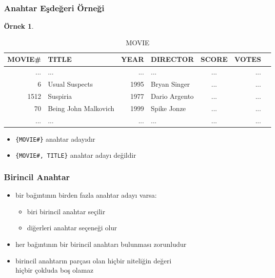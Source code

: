 \documentclass[dvipsnames]{beamer}
\theoremstyle{definition}
\theoremstyle{example}
\newtheorem{ornek}[theorem]{Örnek}
\theoremstyle{plain}
\begin{document}
\begin{frame}
  \frametitle{Anahtar Eşdeğeri Örneği}

  \begin{ornek}
    \begin{tiny}
    \begin{table}
      \caption{MOVIE}
      \begin{tabular}{|r|l|r|l|c|r|r|}\hline
MOVIE\# & TITLE                & YEAR & DIRECTOR      & SCORE & VOTES\\\hline\hline
    ... & ...                  &  ... & ...           & ...   &   ...\\\hline
      6 & Usual Suspects       & 1995 & Bryan Singer  & ...   &   ...\\\hline
   1512 & Suspiria             & 1977 & Dario Argento & ...   &   ...\\\hline
     70 & Being John Malkovich & 1999 & Spike Jonze   & ...   &   ...\\\hline
    ... & ...                  &  ... & ...           & ...   &   ...\\\hline
      \end{tabular}
    \end{table}
    \end{tiny}

    \pause
    \begin{itemize}
      \item \texttt{\{MOVIE\#\}} anahtar adayıdır
      \item \texttt{\{MOVIE\#, TITLE\}} anahtar adayı değildir
    \end{itemize}
  \end{ornek}
\end{frame}

\begin{frame}
  \frametitle{Birincil Anahtar}

  \begin{itemize}
    \item bir bağıntının birden fazla anahtar adayı varsa:
    \begin{itemize}
      \item biri \alert{birincil anahtar} seçilir
      \item diğerleri \alert{anahtar seçeneği} olur
    \end{itemize}

    \pause
    \item her bağıntının bir birincil anahtarı bulunması zorunludur

    \pause
    \item birincil anahtarın parçası olan hiçbir niteliğin değeri\\
      hiçbir çokluda boş olamaz
  \end{itemize}
\end{frame}
\end{document}

